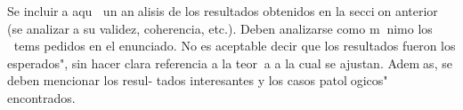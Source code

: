 Se incluira aqu un analisis de los resultados obtenidos en la seccion anterior (se analizara
su  validez,  coherencia,  etc.).   Deben  analizarse  como  mnimo  los tems  pedidos  en  el
enunciado.  No es aceptable decir que los resultados fueron los esperados", sin hacer
clara referencia a la teora a la cual se ajustan.  Ademas, se deben mencionar los resul-
tados interesantes y los casos patologicos" encontrados.

